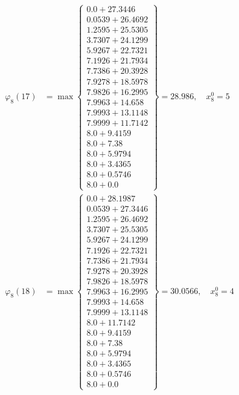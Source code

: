\documentclass{article}
\begin{document}
\begin{align*}
  
\varphi_{8}(17) &= \max \left\{ \begin{array}{c}
0.0 + 27.3446 \\
 0.0539 + 26.4692 \\
 1.2595 + 25.5305 \\
 3.7307 + 24.1299 \\
 5.9267 + 22.7321 \\
 7.1926 + 21.7934 \\
 7.7386 + 20.3928 \\
 7.9278 + 18.5978 \\
 7.9826 + 16.2995 \\
 7.9963 + 14.658 \\
 7.9993 + 13.1148 \\
 7.9999 + 11.7142 \\
 8.0 + 9.4159 \\
 8.0 + 7.38 \\
 8.0 + 5.9794 \\
 8.0 + 3.4365 \\
 8.0 + 0.5746 \\
 8.0 + 0.0
\end{array} \right\}=28.986,\quad x_{8}^0=5\\
  
  
  
  
\varphi_{8}(18) &= \max \left\{ \begin{array}{c}
0.0 + 28.1987 \\
 0.0539 + 27.3446 \\
 1.2595 + 26.4692 \\
 3.7307 + 25.5305 \\
 5.9267 + 24.1299 \\
 7.1926 + 22.7321 \\
 7.7386 + 21.7934 \\
 7.9278 + 20.3928 \\
 7.9826 + 18.5978 \\
 7.9963 + 16.2995 \\
 7.9993 + 14.658 \\
 7.9999 + 13.1148 \\
 8.0 + 11.7142 \\
 8.0 + 9.4159 \\
 8.0 + 7.38 \\
 8.0 + 5.9794 \\
 8.0 + 3.4365 \\
 8.0 + 0.5746 \\
 8.0 + 0.0
\end{array} \right\}=30.0566,\quad x_{8}^0=4\\
  

\end{align*}
\end{document}
